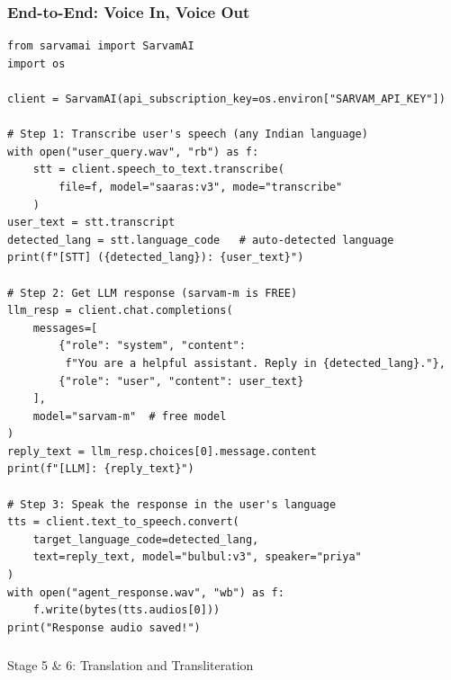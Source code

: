 \begin{frame}[fragile]\frametitle{End-to-End: Voice In, Voice Out}
\begin{lstlisting}
from sarvamai import SarvamAI
import os

client = SarvamAI(api_subscription_key=os.environ["SARVAM_API_KEY"])

# Step 1: Transcribe user's speech (any Indian language)
with open("user_query.wav", "rb") as f:
    stt = client.speech_to_text.transcribe(
        file=f, model="saaras:v3", mode="transcribe"
    )
user_text = stt.transcript
detected_lang = stt.language_code   # auto-detected language
print(f"[STT] ({detected_lang}): {user_text}")

# Step 2: Get LLM response (sarvam-m is FREE)
llm_resp = client.chat.completions(
    messages=[
        {"role": "system", "content":
         f"You are a helpful assistant. Reply in {detected_lang}."},
        {"role": "user", "content": user_text}
    ],
    model="sarvam-m"  # free model
)
reply_text = llm_resp.choices[0].message.content
print(f"[LLM]: {reply_text}")

# Step 3: Speak the response in the user's language
tts = client.text_to_speech.convert(
    target_language_code=detected_lang,
    text=reply_text, model="bulbul:v3", speaker="priya"
)
with open("agent_response.wav", "wb") as f:
    f.write(bytes(tts.audios[0]))
print("Response audio saved!")
\end{lstlisting}
\end{frame}


\begin{frame}[fragile]\frametitle{}
\begin{center}
{\Large Stage 5 \& 6: Translation and Transliteration}
\end{center}
\end{frame}


